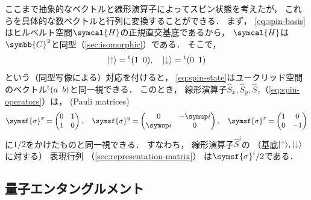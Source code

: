 \documentclass[
]{sotsu}
\newcommand{\bitone}{\mathcolor{fire}{\uparrow}}
\newcommand{\bittwo}{\mathcolor{water}{\downarrow}}
\let\upspin\bitone
\let\dwspin\bittwo
\begin{document}
ここまで抽象的なベクトルと線形演算子によってスピン状態を考えたが，
これらを具体的な数ベクトルと行列に変換することができる．
まず，
\cref{eq:spin-basis}はヒルベルト空間$\symcal{H}$の正規直交基底であるから，
$\symcal{H}$は$\symbb{C}^2$と同型（\cref{sec:isomorphic}）である．
そこで，
\begin{equation}
    \label{eq:spin-basis-vs-C2}
    \ket{\upspin} = \cvector{1 ; 0},
    \quad 
    \ket{\dwspin} = \cvector{0 ; 1}
\end{equation}
という（同型写像による）対応を付けると，
\cref{eq:spin-state}はユークリッド空間のベクトル$\cvector{a ; b}$と同一視できる．
このとき，
線形演算子$\hat{S}_x, \hat{S}_y, \hat{S}_z$（\cref{eq:spin-operators}）は，
(Pauli matrices)
\begin{equation}
    \label{eq:Pauli-matrix}
    \symsf{\sigma}^x = 
    \begin{pmatrix}
        0  &  1  \\
        1  &  0
    \end{pmatrix},
    \quad 
    \symsf{\sigma}^y = 
    \begin{pmatrix}
        0  &  -\iu  \\
        \iu  &  0  
    \end{pmatrix},
    \quad 
    \symsf{\sigma}^z = 
    \begin{pmatrix}
        1  &  0  \\
        0  &  -1
    \end{pmatrix}
\end{equation}
に$1/2$をかけたものと同一視できる．
すなわち，
線形演算子$\hat{S}^i$の
（基底$\ket{\bitone}, \ket{\bittwo}$に対する）
表現行列
（\cref{sec:representation-matrix}）
は$\symsf{\sigma}^i / 2$である．





\subsection{量子エンタングルメント}
\label{sec:entanglement}
\end{document}
